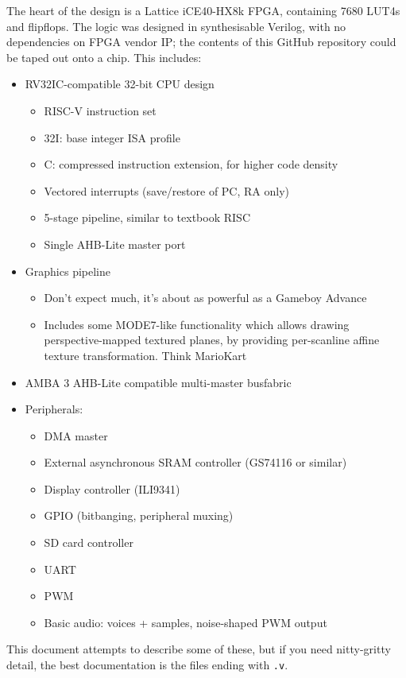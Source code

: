 \documentclass[notitlepage]{article}
\begin{document}
The heart of the design is a Lattice iCE40-HX8k FPGA, containing 7680 LUT4s and flipflops. The logic was designed in synthesisable Verilog, with no dependencies on FPGA vendor IP; the contents of this GitHub repository could be taped out onto a chip. This includes:

\begin{itemize}
\item RV32IC-compatible 32-bit CPU design
	\begin{itemize}
	\item RISC-V instruction set
	\item 32I: base integer ISA profile
	\item C: compressed instruction extension, for higher code density
	\item Vectored interrupts (save/restore of PC, RA only)
	\item 5-stage pipeline, similar to textbook RISC
	\item Single AHB-Lite master port
	\end{itemize}
\item Graphics pipeline
	\begin{itemize}
	\item Don't expect much, it's about as powerful as a Gameboy Advance
	\item Includes some MODE7-like functionality which allows drawing perspective-mapped textured planes, by providing per-scanline affine texture transformation. Think MarioKart
	\end{itemize}
\item AMBA 3 AHB-Lite compatible multi-master busfabric
\item Peripherals:
	\begin{itemize}
	\item DMA master
	\item External asynchronous SRAM controller (GS74116 or similar)
	\item Display controller (ILI9341)
	\item GPIO (bitbanging, peripheral muxing)
	\item SD card controller
	\item UART
	\item PWM
	\item Basic audio: voices + samples, noise-shaped PWM output
	\end{itemize}
\end{itemize}

This document attempts to describe some of these, but if you need nitty-gritty detail, the best documentation is the files ending with {\tt .v}.
\end{document}
